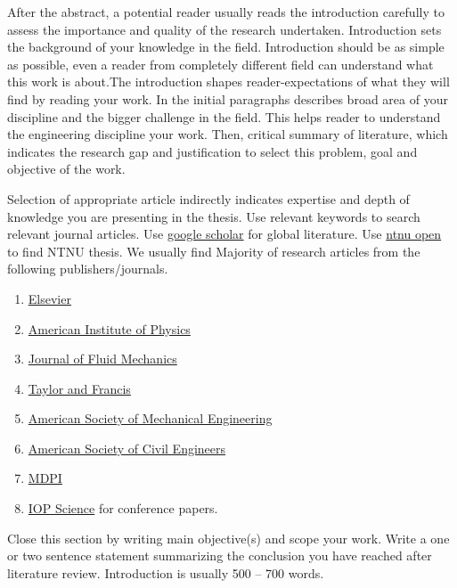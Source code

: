 \documentclass[subscriptcorrection,upint,varvw,mathalfa=cal=euler,barcolor=black,balance,hyphenate,french,pdf-a,nolists]{asmejour}
\begin{document}
After the abstract, a potential reader usually reads the introduction carefully to assess the importance and quality of the research undertaken. Introduction sets the background of your knowledge in the field. Introduction should be as simple as possible, even a reader from completely different field can understand what this work is about.The introduction shapes reader-expectations of what they will find by reading your work. In the initial paragraphs describes broad area of your discipline and the bigger challenge in the field. This helps reader to understand the engineering discipline your work. Then, critical summary of literature, which indicates the research gap and justification to select this problem, goal and objective of the work.

Selection of appropriate article indirectly indicates expertise and depth of knowledge you are presenting in the thesis. Use relevant keywords to search relevant journal articles. Use \href{https://scholar.google.com/}{google scholar} for global literature. Use \href{https://ntnuopen.ntnu.no/ntnu-xmlui/handle/11250/227455}{ntnu open} to find NTNU thesis. We usually find Majority of research articles from the following publishers/journals.

\begin{enumerate}
    \item \href{https://www.elsevier.com/}{Elsevier}
    \item \href{https://www.aip.org/}{American Institute of Physics}
    \item \href{https://www.cambridge.org/core/journals/journal-of-fluid-mechanics}{Journal of Fluid Mechanics}
    \item \href{https://www.tandfonline.com/}{Taylor and Francis}
    \item \href{https://asmedigitalcollection.asme.org/}{American Society of Mechanical Engineering}
    \item \href{https://www.asce.org/}{American Society of Civil Engineers}
    \item \href{https://www.mdpi.com/}{MDPI}
    \item \href{https://iopscience.iop.org/}{IOP Science} for conference papers.
\end{enumerate}

Close this section by writing main objective(s) and scope your work. Write a one or two sentence statement summarizing the conclusion you have reached after literature review. Introduction is usually 500 -- 700 words.
\end{document}
